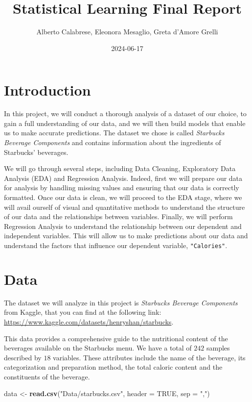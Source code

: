 \documentclass[
]{article}
\title{Statistical Learning Final Report}
\author{Alberto Calabrese, Eleonora Mesaglio, Greta d'Amore Grelli}
\date{2024-06-17}
\newenvironment{Shaded}{\begin{snugshade}}{\end{snugshade}}
\newcommand{\AttributeTok}[1]{\textcolor[rgb]{0.13,0.29,0.53}{#1}}
\newcommand{\ConstantTok}[1]{\textcolor[rgb]{0.56,0.35,0.01}{#1}}
\newcommand{\FunctionTok}[1]{\textcolor[rgb]{0.13,0.29,0.53}{\textbf{#1}}}
\newcommand{\NormalTok}[1]{#1}
\newcommand{\OtherTok}[1]{\textcolor[rgb]{0.56,0.35,0.01}{#1}}
\newcommand{\StringTok}[1]{\textcolor[rgb]{0.31,0.60,0.02}{#1}}
\begin{document}
\maketitle

{
\setcounter{tocdepth}{3}
\tableofcontents
}
\section{Introduction}\label{introduction}

In this project, we will conduct a thorough analysis of a dataset of our
choice, to gain a full understanding of our data, and we will then build
models that enable us to make accurate predictions. The dataset we chose
is called \emph{Starbucks Beverage Components} and contains information
about the ingredients of Starbucks' beverages.

We will go through several steps, including Data Cleaning, Exploratory
Data Analysis (EDA) and Regression Analysis. Indeed, first we will
prepare our data for analysis by handling missing values and ensuring
that our data is correctly formatted. Once our data is clean, we will
proceed to the EDA stage, where we will avail ourself of visual and
quantitative methods to understand the structure of our data and the
relationships between variables. Finally, we will perform Regression
Analysis to understand the relationship between our dependent and
independent variables. This will allow us to make predictions about our
data and understand the factors that influence our dependent variable,
\texttt{"Calories"}.

\section{Data}\label{data}

The dataset we will analyze in this project is \emph{Starbucks Beverage
Components} from Kaggle, that you can find at the following link:
\url{https://www.kaggle.com/datasets/henryshan/starbucks}.

This data provides a comprehensive guide to the nutritional content of
the beverages available on the Starbucks menu. We have a total of
\(242\) samples described by \(18\) variables. These attributes include
the name of the beverage, its categorization and preparation method, the
total caloric content and the constituents of the beverage.

\begin{Shaded}
\begin{Highlighting}[]
\NormalTok{data }\OtherTok{\textless{}{-}} \FunctionTok{read.csv}\NormalTok{(}\StringTok{"Data/starbucks.csv"}\NormalTok{, }\AttributeTok{header =} \ConstantTok{TRUE}\NormalTok{, }\AttributeTok{sep =} \StringTok{","}\NormalTok{)}
\end{Highlighting}
\end{Shaded}
\end{document}
